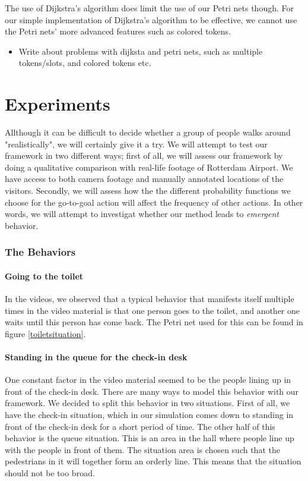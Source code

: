 \documentclass[11pt]{book}
\begin{document}
The use of Dijkstra's algorithm does limit the use of our Petri nets though. For our simple implementation of Dijkstra's algorithm to be effective, we cannot use the Petri nets' more advanced features such as colored tokens.

\begin{itemize}
\item Write about problems with dijksta and petri nets, such as multiple tokens/slots, and colored tokens etc.
\end{itemize}



\section{Experiments}
Allthough it can be difficult to decide whether a group of people walks around "realistically", we will certainly give it a try. We will attempt to test our framework in two different ways; first of all, we will assess our framework by doing a qualitative comparison with real-life footage of Rotterdam Airport. We have access to both camera footage and manually annotated locations of the visitors. Secondly, we will assess how the the different probability functions we choose for the go-to-goal action will affect the frequency of other actions. In other words, we will attempt to investigat whether our method leads to \emph{emergent}  behavior.


\subsubsection{The Behaviors}

\paragraph{Going to the toilet}
In the videos, we observed that a typical behavior that manifests itself multiple times in the video material is that one person goes to the toilet, and another one waits until this person has come back. The Petri net used for this can be found in figure \ref{toiletsituation}.

\paragraph{Standing in the queue for the check-in desk}
One constant factor in the video material seemed to be the people lining up in front of the check-in desk. There are many ways to model this behavior with our framework.
We decided to split this behavior in two situations. First of all, we have the check-in situation, which in our simulation comes down to standing in front of the check-in desk for a short period of time. The other half of this behavior is the queue situation. This is an area in the hall where people line up with the people in front of them. The situation area is chosen such that the pedestrians in it will together form an orderly line. This means that the situation should not be too broad.
\end{document}
